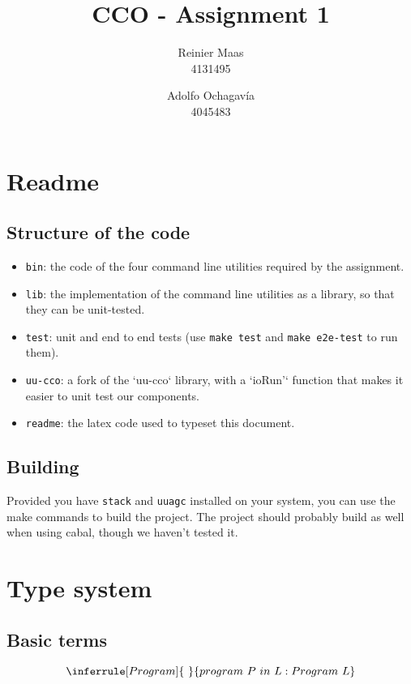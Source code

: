 \documentclass{article}
\author{
  Reinier Maas \\ 4131495
  \and
  Adolfo Ochagavía \\ 4045483
}
\title{CCO - Assignment 1}
\begin{document}
\maketitle


\section{Readme}

\subsection*{Structure of the code}

\begin{itemize}
\item \texttt{bin}: the code of the four command line utilities required by the assignment.
\item \texttt{lib}: the implementation of the command line utilities as a library, so that they can be unit-tested.
\item \texttt{test}: unit and end to end tests (use \texttt{make test} and \texttt{make e2e-test} to run them).
\item \texttt{uu-cco}: a fork of the `uu-cco` library, with a `ioRun'` function that makes it easier to unit test our components.
\item \texttt{readme}: the latex code used to typeset this document.
\end{itemize}

\subsection*{Building}

Provided you have \texttt{stack} and \texttt{uuagc} installed on your system, you can use the make commands to build the project. The project should probably build as well when using cabal, though we haven't tested it.

\section{Type system}

\subsection*{Basic terms}

\[
\inferrule[Program]{\ }{program\ P\ in\ L : Program\ L}
\]
\end{document}

